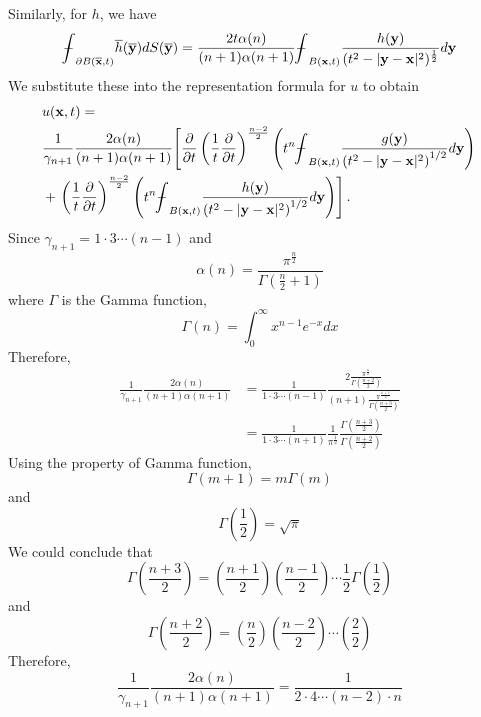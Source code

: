 \documentclass[10pt]{article}
\def\vc{{\mathbf x}}
\def\vcc{{\mathbf y}}
\newcommand\tbbint{{-\mkern -16mu\int}}
\newcommand\dbbint{{-\mkern -19mu\int}}
\newcommand\bbint{
{\mathchoice{\dbbint}{\tbbint}{\tbbint}{\tbbint}}
}
\begin{document}
Similarly, for $h$, we have
\begin{equation*}
    \bbint_{\partial B(\overline{\vc},t)}\overline{h}(\overline{\vcc})dS(\overline{\vcc}) = \frac{2 t \alpha(n)}{(n+1)\alpha(n+1)}\bbint_{B(\vc,t)}\frac{h(\vcc)}{(t^2 - |\vcc-\vc|^2)^{\frac{1}{2}}}d\vcc \\
\end{equation*}
We substitute these into the representation formula for $u$ to obtain
$$
\begin{aligned}
& u(\vc, t)= \\
& \frac{1}{\gamma_{n+1}} \frac{2 \alpha(n)}{(n+1) \alpha(n+1)} {\left[\frac{\partial}{\partial t}\left(\frac{1}{t} \frac{\partial}{\partial t}\right)^{\frac{n-2}{2}}\left(t^{n} \bbint_{B(\vc, t)} \frac{g(\vcc)}{\left(t^{2}-|\vcc-\vc|^{2}\right)^{1 / 2}} d \vcc\right)\right.} \\
&+\left.\left(\frac{1}{t} \frac{\partial}{\partial t}\right)^{\frac{n-2}{2}}\left(t^{n} \bbint_{B(\vc, t)} \frac{h(\vcc)}{\left(t^{2}-|\vcc-\vc|^{2}\right)^{1 / 2}} d \vcc\right)\right] .
\end{aligned}
$$
Since $\gamma_{n+1} = 1 \cdot 3 \cdots (n-1)$ and
\begin{equation*}
    \alpha(n) = \frac{\pi^{\frac{n}{2}}}{\Gamma(\frac{n}{2}+1)}
\end{equation*}
where $\Gamma$ is the Gamma function,
$$
\Gamma(n) = \int_{0}^{\infty} x^{n-1} e^{-x} d x
$$
Therefore,
\begin{align*}
   \frac{1}{\gamma_{n+1}} \frac{2 \alpha(n)}{(n+1) \alpha(n+1)} &= \frac{1}{1 \cdot 3 \cdots (n-1)} \frac{2 \frac{\pi^\frac{n}{2}}{\Gamma{(\frac{n+2}{2})}}}{(n+1) \frac{\pi^{\frac{n+1}{2}}}{\Gamma({\frac{n+3}{2}})}} \\
    &= \frac{1}{1 \cdot 3 \cdots (n+1)} \frac{1}{\pi^{\frac{1}{2}}} \frac{\Gamma(\frac{n+3}{2})}{\Gamma(\frac{n+2}{2})}
\end{align*}
Using the property of Gamma function,
$$
\Gamma(m+1) = m \Gamma(m)
$$
and
$$
\Gamma\left(\frac{1}{2}\right) = \sqrt{\pi}
$$
We could conclude that
\begin{equation*}
    \Gamma\left(\frac{n+3}{2}\right) =\left( \frac{n+1}{2}\right) \left(\frac{n-1}{2}\right) \cdots \frac{1}{2} \Gamma\left(\frac{1}{2}\right)
\end{equation*}
and
$$
\Gamma\left(\frac{n+2}{2}\right) =\left( \frac{n}{2}\right) \left(\frac{n-2}{2}\right) \cdots \left(\frac{2}{2}\right)
$$
Therefore,
$$
\frac{1}{\gamma_{n+1}} \frac{2 \alpha(n)}{(n+1)\alpha(n+1)} = \frac{1}{2 \cdot 4 \cdots (n-2) \cdot n}
$$
\end{document}
